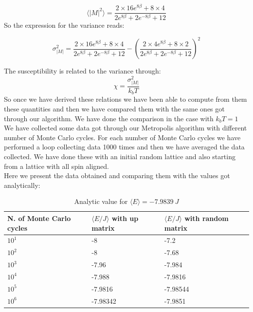 \documentclass[10pt,a4paper,titlepage]{article}
\begin{document}
\begin{equation}
\langle|M|^2\rangle=\frac{2 \times 16 e ^{8 \beta}+ 8 \times 4}{2 e^{ 8 \beta }+2e^{- 8 \beta }+12}
\end{equation}
So the expression for the variance reads: \begin{center}
\begin{equation}\sigma^2_{|M|}=\frac{2 \times 16 e ^{8 \beta}+ 8 \times 4}{2 e^{ 8 \beta }+2e^{- 8 \beta }+12}-\left(\frac{2 \times 4 e^{8 \beta}+8 \times 2}{2 e^{ 8 \beta }+2e^{- 8 \beta }+12}\right)^2
\end{equation}
\end{center}
The susceptibility is related to the variance through: $$\chi=\frac{\sigma^2_{|M|}}{k_b T}$$
So once we have derived these relations we have been able to compute from them these quantities and then we have compared them with the same ones got through our algorithm. We have done the comparison in the case with $k_b T=1$
\\
We have collected some data got through our Metropolis algorithm with different number of Monte Carlo cycles. 
For each number of Monte Carlo cycles we have performed a loop collecting data 1000 times and then we have averaged the data collected. We have done these with an initial random lattice and also starting from a lattice with all spin aligned. 
\\
Here we present the data obtained and comparing them with the values got analytically:
\\
\begin{minipage}[b]{0.5\textwidth}\centering
\begin{table}[H]
\caption{{\footnotesize Analytic value for  $\langle E \rangle = -7.9839 ~ J$}}
\begin{center}

\begin{tabular}[t]{|p{2.3cm}|p{2.3cm}|p{2.3cm}|}
\hline
N. of Monte Carlo cycles & $\langle E/J \rangle$   with up matrix & $\langle  E/J \rangle $   with random matrix \\\hline
$10^{1}$ & -8 &-7.2\\\hline
$10^{2}$& -8 &-7.68\\\hline
$10^{3}$ &  -7.96 &-7.984\\\hline
$10^{4}$ & -7.988 &-7.9816\\\hline
$10^{5}$& -7.9816 &-7.98544\\\hline
$10^{6}$& -7.98342 &-7.9851\\\hline

\end{tabular}
\end{center}
\end{table}
\end{minipage}
\end{document}
